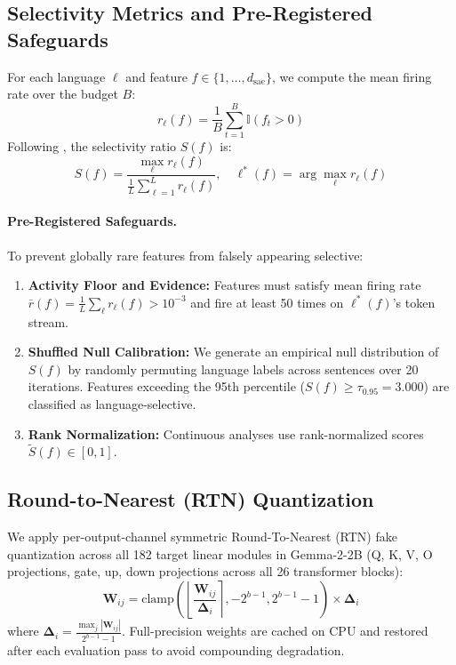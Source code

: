 \documentclass[11pt]{article}
\begin{document}
\subsection{Selectivity Metrics and Pre-Registered Safeguards}
For each language $\ell$ and feature $f \in \{1, \dots, d_{\text{sae}}\}$, we compute the mean firing rate over the budget $B$:
\begin{equation}
r_\ell(f) = \frac{1}{B} \sum_{t=1}^{B} \mathbb{I}(f_t > 0)
\end{equation}
Following \citet{deng2025unveiling}, the selectivity ratio $S(f)$ is:
\begin{equation}
S(f) = \frac{\max_\ell r_\ell(f)}{\frac{1}{L} \sum_{\ell=1}^L r_\ell(f)}, \quad \ell^*(f) = \arg\max_\ell r_\ell(f)
\end{equation}

\paragraph{Pre-Registered Safeguards.}
To prevent globally rare features from falsely appearing selective:
\begin{enumerate}
    \item \textbf{Activity Floor and Evidence:} Features must satisfy mean firing rate $\bar{r}(f) = \frac{1}{L}\sum_\ell r_\ell(f) > 10^{-3}$ and fire at least 50 times on $\ell^*(f)$'s token stream.
    \item \textbf{Shuffled Null Calibration:} We generate an empirical null distribution of $S(f)$ by randomly permuting language labels across sentences over 20 iterations. Features exceeding the 95th percentile ($S(f) \ge \tau_{0.95} = 3.000$) are classified as language-selective.
    \item \textbf{Rank Normalization:} Continuous analyses use rank-normalized scores $\tilde{S}(f) \in [0, 1]$.
\end{enumerate}

\subsection{Round-to-Nearest (RTN) Quantization}
We apply per-output-channel symmetric Round-To-Nearest (RTN) fake quantization across all 182 target linear modules in Gemma-2-2B (Q, K, V, O projections, gate, up, down projections across all 26 transformer blocks):
\begin{equation}
\hat{\mathbf{W}}_{ij} = \text{clamp}\left(\left\lfloor \frac{\mathbf{W}_{ij}}{\mathbf{\Delta}_i} \right\rceil, -2^{b-1}, 2^{b-1}-1\right) \times \mathbf{\Delta}_i
\end{equation}
where $\mathbf{\Delta}_i = \frac{\max_j |\mathbf{W}_{ij}|}{2^{b-1}-1}$. Full-precision weights are cached on CPU and restored after each evaluation pass to avoid compounding degradation.
\end{document}
